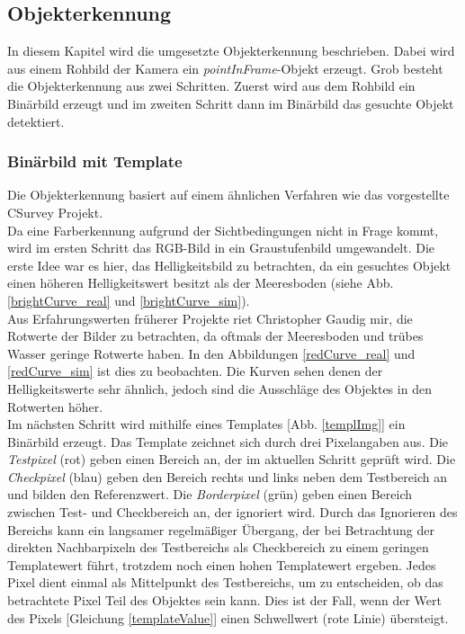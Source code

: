 \subsection{Objekterkennung}
\label{sec_objDet}
In diesem Kapitel wird die umgesetzte Objekterkennung beschrieben. Dabei wird aus einem Rohbild der Kamera ein \textit{pointInFrame}-Objekt erzeugt. Grob besteht die Objekterkennung aus zwei Schritten. Zuerst wird aus dem Rohbild ein Binärbild erzeugt und im zweiten Schritt dann im Binärbild das gesuchte Objekt detektiert.
\subsubsection{Binärbild mit Template}
\label{sec_templ}
Die Objekterkennung basiert auf einem ähnlichen Verfahren wie das vorgestellte CSurvey Projekt\cite{Albiez2015CSurveyA}.\\
Da eine Farberkennung aufgrund der Sichtbedingungen nicht in Frage kommt, wird im ersten Schritt das RGB-Bild in ein Graustufenbild umgewandelt. Die erste Idee war es hier, das Helligkeitsbild zu betrachten, da ein gesuchtes Objekt einen höheren Helligkeitswert besitzt als der Meeresboden (siehe Abb. \ref{brightCurve_real} und \ref{brightCurve_sim}).\\
Aus Erfahrungswerten früherer Projekte riet Christopher Gaudig mir, die Rotwerte der Bilder zu betrachten, da oftmals der Meeresboden und trübes Wasser geringe Rotwerte haben. In den Abbildungen \ref{redCurve_real} und \ref{redCurve_sim} ist dies zu beobachten. Die Kurven sehen denen der Helligkeitswerte sehr ähnlich, jedoch sind die Ausschläge des Objektes in den Rotwerten höher.\\
Im nächsten Schritt wird mithilfe eines Templates [Abb. \ref{templImg}] ein Binärbild erzeugt. Das Template zeichnet sich durch drei Pixelangaben aus. Die \textit{Testpixel} (rot) geben einen Bereich an, der im aktuellen Schritt geprüft wird. Die \textit{Checkpixel} (blau) geben den Bereich rechts und links neben dem Testbereich an und bilden den Referenzwert. Die \textit{Borderpixel} (grün) geben einen Bereich zwischen Test- und Checkbereich an, der ignoriert wird. Durch das Ignorieren des Bereichs kann ein langsamer regelmäßiger Übergang, der bei Betrachtung der direkten Nachbarpixeln des Testbereichs als Checkbereich zu einem geringen Templatewert führt, trotzdem noch einen hohen Templatewert ergeben. Jedes Pixel dient einmal als Mittelpunkt des Testbereichs, um zu entscheiden, ob das betrachtete Pixel Teil des Objektes sein kann. Dies ist der Fall, wenn der Wert des Pixels [Gleichung \ref{templateValue}] einen Schwellwert (rote Linie) übersteigt.\\

